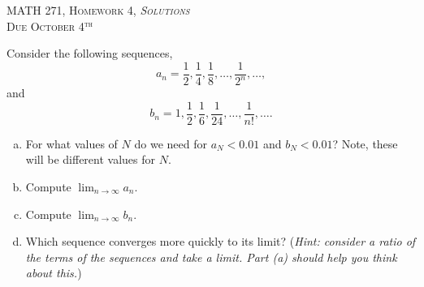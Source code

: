 \documentclass[12pt]{article} %
\begin{document}
\begin{center}
   \textsc{\large MATH 271, Homework 4, \emph{Solutions}}\\
   \textsc{Due October 4$^\textrm{th}$}
\end{center}
\vspace{.5cm}

\begin{problem}
Consider the following sequences,
\[
a_n = \frac{1}{2}, \frac{1}{4}, \frac{1}{8}, \dots, \frac{1}{2^n}, \dots,
\]
and
\[
b_n =  1, \frac{1}{2}, \frac{1}{6},\frac{1}{24}, \dots,\frac{1}{n!}, \dots.
\]
\begin{enumerate}[(a)]
    \item For what values of $N$ do we need for $a_N<0.01$ and $b_N<0.01$? Note, these will be different values for $N$.
    \item Compute $\displaystyle{\lim_{n\to \infty} a_n}$.
    \item Compute $\displaystyle{\lim_{n\to \infty} b_n}$.
    \item Which sequence converges more quickly to its limit? (\emph{Hint: consider a ratio of the terms of the sequences and take a limit. Part (a) should help you think about this.})
\end{enumerate}
\end{problem}
\end{document}
